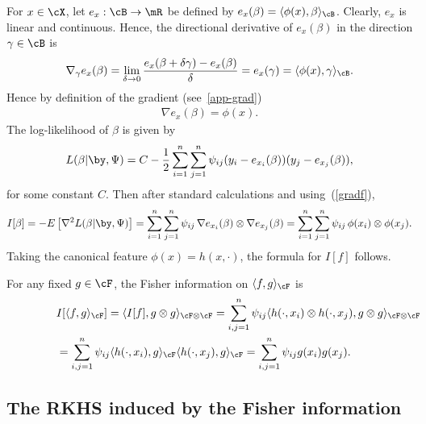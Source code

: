 \documentclass[preprint,12pt,authoryear]{elsarticle}
\begin{document}
\noindent{}
For $x\in\cX$, let $e_x:\cB\rightarrow\mR$ be defined by $e_x(\beta)=\langle\phi(x),\beta\rangle_\cB$. Clearly, $e_x$ is linear and continuous. Hence, the directional derivative of $e_x(\beta)$ in the direction $\gamma\in\cB$ is
\[  \nabla_\gamma e_x(\beta) = \lim_{\delta\rightarrow 0}\frac{e_x(\beta+\delta \gamma)-e_x(\beta)}{\delta} = e_x(\gamma) = \langle \phi(x),\gamma\rangle_\cB . \]
Hence by definition of the gradient (see~\ref{app-grad})  %
\begin{eqnarray}\label{gradf}
\nabla e_x(\beta) = \phi(x).
\end{eqnarray}
The log-likelihood of $\beta$ is given by
\begin{eqnarray*}
	L(\beta|\by,\Psi)
	=
	C - \frac12 \sum_{i=1}^n\sum_{j=1}^n\psi_{ij}(y_i-e_{x_i}(\beta))(y_j-e_{x_j}(\beta)),
\end{eqnarray*}
for some constant $C$.
Then after standard calculations and using~(\ref{gradf}),
\begin{eqnarray*}
	I[\beta] = -E\left[\nabla^2 L(\beta|\by,\Psi)\right] =  \sum_{i=1}^n\sum_{j=1}^n\psi_{ij}\,\nabla e_{x_i}(\beta)\otimes\nabla e_{x_j}(\beta) = \sum_{i=1}^n\sum_{j=1}^n \psi_{ij}\,\phi(x_i)\otimes\phi(x_j).
\end{eqnarray*}
Taking the canonical feature $\phi(x)=h(x,\cdot)$, the formula for $I[f]$ follows.

For any fixed $g\in\cF$, the Fisher information on $\langle f,g\rangle_\cF$ is
\begin{align*}
\lefteqn{
	I[\langle f,g\rangle_\cF] =
	\langle I[f],g\otimes g\rangle_{\cF\otimes\cF}
	= \sum_{i,j=1}^n \psi_{ij}\langle h(\cdot,x_i)\otimes h(\cdot,x_j),g\otimes g\rangle_{\cF\otimes\cF}
}\\
&
= \sum_{i,j=1}^n \psi_{ij}\langle h(\cdot,x_i),g\rangle_\cF\langle h(\cdot,x_j),g\rangle_\cF = \sum_{i,j=1}^n \psi_{ij}g(x_i)g(x_j).
\end{align*}

\endproof





\subsection{The RKHS induced by the Fisher information} \label{sec-inducedrkhs}
\end{document}
